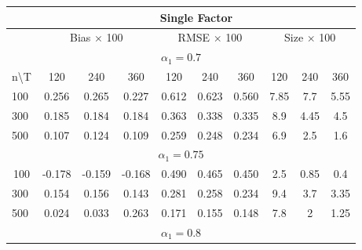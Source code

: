 \begin{table}[!hbt]
	\begin{tabular}{lccccccccc}
		\hline
		\hline
		\multicolumn{1}{l|}{}                   & \multicolumn{9}{c}{Single Factor}                                                               \\ \hline
		\multicolumn{1}{l|}{}                   & \multicolumn{3}{c|}{Bias $\times$ 100}        & \multicolumn{3}{c|}{RMSE $\times$ 100}     & \multicolumn{3}{c}{Size $\times$ 100} \\ \hline
		\multicolumn{10}{c}{$\alpha_1 = 0.7$}                                                                                                                            \\ \hline
		\multicolumn{1}{l|}{n\textbackslash{}T} & 120    & 240    & \multicolumn{1}{c|}{360}    & 120   & 240   & \multicolumn{1}{c|}{360}   & 120         & 240         & 360        \\ \hline
		\multicolumn{1}{l|}{100}                & 0.256  & 0.265  & \multicolumn{1}{c|}{0.227}  & 0.612 & 0.623 & \multicolumn{1}{c|}{0.560} & 7.85        & 7.7         & 5.55       \\
		\multicolumn{1}{l|}{300}                & 0.185  & 0.184  & \multicolumn{1}{c|}{0.184}  & 0.363 & 0.338 & \multicolumn{1}{c|}{0.335} & 8.9         & 4.45        & 4.5        \\
		\multicolumn{1}{l|}{500}                & 0.107  & 0.124  & \multicolumn{1}{c|}{0.109}  & 0.259 & 0.248 & \multicolumn{1}{c|}{0.234} & 6.9         & 2.5         & 1.6        \\ \hline
		\multicolumn{10}{c}{$\alpha_1 = 0.75$}                                                                                                                          \\ \hline
		\multicolumn{1}{c|}{100}                & -0.178 & -0.159 & \multicolumn{1}{c|}{-0.168} & 0.490 & 0.465 & \multicolumn{1}{c|}{0.450} & 2.5         & 0.85        & 0.4        \\
		\multicolumn{1}{l|}{300}                & 0.154  & 0.156  & \multicolumn{1}{c|}{0.143}  & 0.281 & 0.258 & \multicolumn{1}{c|}{0.234} & 9.4         & 3.7         & 3.35       \\
		\multicolumn{1}{l|}{500}                & 0.024  & 0.033  & \multicolumn{1}{c|}{0.263}  & 0.171 & 0.155 & \multicolumn{1}{c|}{0.148} & 7.8         & 2           & 1.25       \\ \hline
		\multicolumn{10}{c}{$\alpha_1 = 0.8$}                                                                                                                           \\ \hline

\end{tabular}
\end{table}
